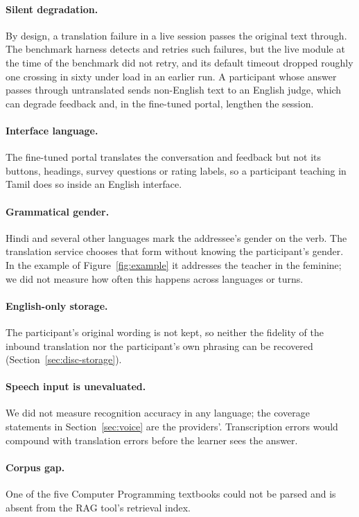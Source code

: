 \documentclass[pdflatex,sn-mathphys-num]{sn-jnl}%
\theoremstyle{thmstyleone}%
\theoremstyle{thmstyletwo}%
\theoremstyle{thmstylethree}%
\begin{document}
\paragraph{Silent degradation.} By design, a translation failure in a live session passes the
original text through. The benchmark harness detects and retries such failures, but the live module
at the time of the benchmark did not retry, and its default timeout dropped roughly one crossing in
sixty under load in an earlier run. A participant whose answer passes
through untranslated sends non-English text to an English judge, which can degrade feedback and, in
the fine-tuned portal, lengthen the session.

\paragraph{Interface language.} The fine-tuned portal translates the conversation and feedback but
not its buttons, headings, survey questions or rating labels, so a participant teaching in Tamil
does so inside an English interface.

\paragraph{Grammatical gender.} Hindi and several other languages mark the addressee's gender on
the verb. The translation service chooses that form without knowing the participant's gender. In
the example of Figure~\ref{fig:example} it addresses the teacher in the feminine; we did not
measure how often this happens across languages or turns.

\paragraph{English-only storage.} The participant's original wording is not kept, so neither the
fidelity of the inbound translation nor the participant's own phrasing can be recovered
(Section~\ref{sec:disc-storage}).

\paragraph{Speech input is unevaluated.} We did not measure recognition accuracy in any language;
the coverage statements in Section~\ref{sec:voice} are the providers'. Transcription errors would
compound with translation errors before the learner sees the answer.

\paragraph{Corpus gap.} One of the five Computer Programming textbooks could not be parsed and is
absent from the RAG tool's retrieval index.
\end{document}
